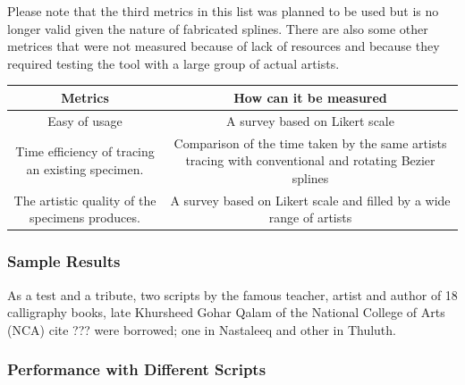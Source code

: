 Please note that the third metrics in this list was planned to be used but is no longer valid given the nature of fabricated splines.
There are also some other metrices that were not measured because of lack of resources and because they required testing the tool with a large group of actual artists.
\begin{tabular}{|c|c|}
  \hline
  Metrics & How can it be measured \\
  \hline
Easy of usage & A survey based on Likert scale \\
Time efficiency of tracing an existing specimen. & Comparison of the time taken by the same artists tracing with conventional and rotating Bezier splines \\
The artistic quality of the specimens produces. & A survey based on Likert scale and filled by a wide range of artists \\
\end{tabular}

\subsubsection{Sample Results}
As a test and a tribute, two scripts by the famous teacher, artist and author of 18 calligraphy books, late Khursheed Gohar Qalam of the National College of Arts (NCA) cite ??? were borrowed; one in Nastaleeq and other in Thuluth.

\subsubsection{Performance with Different Scripts} 